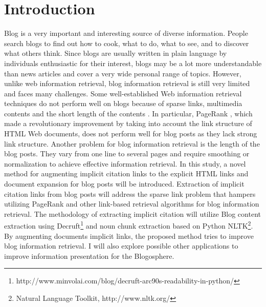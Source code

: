 \documentclass{sig-alternate}
\begin{document}



\section{Introduction}

Blog is a very important and interesting source of diverse information. People search blogs to find out how to cook, what to do, what to see, and to discover what others think. Since blogs are usually written in plain language by individuals enthusiastic for their interest, blogs may be a lot more understandable than news articles and cover a very wide personal range of topics. However, unlike web information retrieval, blog information retrieval is still very limited and faces many challenges. Some well-established Web information retrieval techniques do not perform well on blogs because of sparse links, multimedia contents and the short length of the contents \cite{Agarwal}. In particular, PageRank \cite{Brin1998a}, which made a revolutionary improvement by taking into account the link structure of HTML Web documents, does not perform well for blog posts as they lack strong link structure. Another problem for blog information retrieval is the length of the blog posts. They vary from one line to several pages and require smoothing or normalization to achieve effective information retrieval. 
	In this study, a novel method for augmenting implicit citation links to the explicit HTML links and document expansion for blog posts will be introduced. Extraction of implicit citation links from blog posts will address the sparse link problem that hampers utilizing PageRank and other link-based retrieval algorithms for blog information retrieval. The methodology of extracting implicit citation will utilize Blog content extraction using Decruft\footnote{http://www.minvolai.com/blog/decruft-arc90s-readability-in-python/} and noun chunk extraction based on Python NLTK\footnote{Natural Language Toolkit, http://www.nltk.org/}. By augmenting documents implicit links, the proposed method tries to improve blog information retrieval. I will also explore possible other applications to improve information presentation for the Blogosphere.
\end{document}
